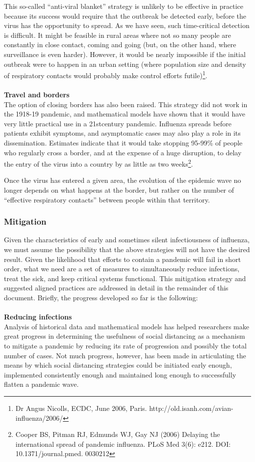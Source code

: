 \documentclass[12pt, a4]{scrartcl}
\begin{document}
This so-called “anti-viral blanket” strategy is unlikely to be effective in practice because its success would require that the outbreak be detected early, before the virus has the opportunity to spread. As we have seen, such time-critical detection is difficult. It might be feasible in rural areas where not so many people are constantly in close contact, coming and going (but, on the other hand, where surveillance is even harder). However, it would be nearly impossible if the initial outbreak were to happen in an urban setting (where population size and density of respiratory contacts would probably make control efforts futile)\footnote{Dr Angus Nicolls, ECDC, June 2006, Paris. http://old.isanh.com/avian-influenza/2006/}.
\\
\\
\textbf{Travel and borders}\\
The option of closing borders has also been raised. This strategy did not work in the 1918-19 pandemic, and mathematical models have shown that it would have very little practical use in a 21stcentury pandemic. Influenza spreads before patients exhibit symptoms, and asymptomatic cases may also play a role in its dissemination. Estimates indicate that it would take stopping 95-99\% of people who regularly cross a border, and at the expense of a huge disruption, to delay the entry of the virus into a country by as little as two weeks\footnote{Cooper BS, Pitman RJ, Edmunds WJ, Gay NJ (2006) Delaying the international spread of pandemic influenza. PLoS Med 3(6): e212. DOI: 10.1371/journal.pmed. 0030212}.

Once the virus has entered a given area, the evolution of the epidemic wave no longer depends on what happens at the border, but rather on the number of “effective respiratory contacts” between people within that territory.

\subsubsection{Mitigation}
Given the characteristics of early and sometimes silent infectiousness of influenza, we must assume the possibility that the above strategies will not have the desired result. Given the likelihood that efforts to contain a pandemic will fail in short order, what we need are a set of measures to simultaneously reduce infections, treat the sick, and keep critical systems functional. This mitigation strategy and suggested aligned practices are addressed in detail in the remainder of this document. Briefly, the progress developed so far is the following:
\\
\\
\textbf{Reducing infections}\\
Analysis of historical data and mathematical models has helped researchers make great progress in determining the usefulness of social distancing as a mechanism to mitigate a pandemic by reducing its rate of progression and possibly the total number of cases. Not much progress, however, has been made in articulating the means by which social distancing strategies could be initiated early enough, implemented consistently enough and maintained long enough to successfully flatten a pandemic wave.
\end{document}
